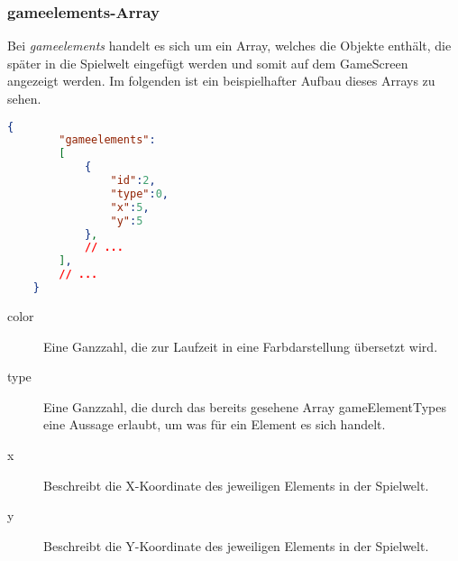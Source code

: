 \begin{minipage}{1\textwidth}

\subsubsection{gameelements-Array}

Bei \textit{gameelements} handelt es sich um ein Array, welches die Objekte enthält, die später in die Spielwelt eingefügt werden und somit auf dem GameScreen angezeigt werden. Im folgenden ist ein beispielhafter Aufbau dieses Arrays zu sehen.

\begin{lstlisting}[language=json,firstnumber=1] 
	{
		"gameelements":
		[  
			{  
				"id":2,
				"type":0,
				"x":5,
				"y":5
			},
			// ...
		],
		// ...
	}
\end{lstlisting}

\begin{description}
	\item[color] Eine Ganzzahl, die zur Laufzeit in eine Farbdarstellung übersetzt wird.
	\item[type] Eine Ganzzahl, die durch das bereits gesehene Array gameElementTypes eine Aussage erlaubt, um was für ein Element es sich handelt.
	\item[x] Beschreibt die X-Koordinate des jeweiligen Elements in der Spielwelt.
	\item[y] Beschreibt die Y-Koordinate des jeweiligen Elements in der Spielwelt.
\end{description}

\end{minipage}


